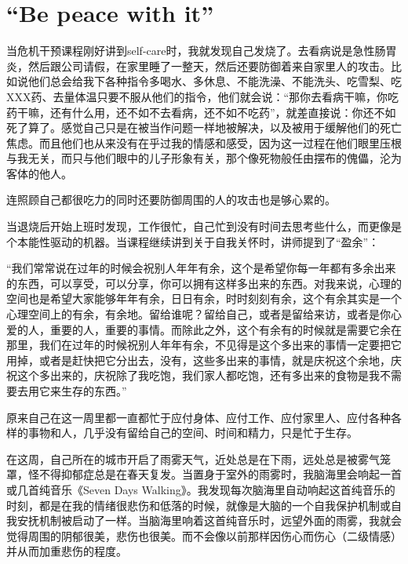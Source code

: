 \chapter{“Be peace with it”}



当危机干预课程刚好讲到self-care时，我就发现自己发烧了。去看病说是急性肠胃炎，然后跟公司请假，在家里睡了一整天，然后还要防御着来自家里人的攻击。比如说他们总会给我下各种指令\pozhehao{}多喝水、多休息、不能洗澡、不能洗头、吃雪梨、吃XXX药、去量体温\pozhehao{}只要不服从他们的指令，他们就会说：“那你去看病干嘛，你吃药干嘛，还有什么用，还不如不去看病，还不如不吃药”，就差直接说：你还不如死了算了。感觉自己只是在被当作问题一样地被解决，以及被用于缓解他们的死亡焦虑。而且他们也从来没有在乎过我的情感和感受，因为这一过程在他们眼里压根与我无关，而只与他们眼中的儿子形象有关，那个像死物般任由摆布的傀儡，沦为客体的他人。

连照顾自己都很吃力的同时还要防御周围的人的攻击也是够心累的。

当退烧后开始上班时发现，工作很忙，自己忙到没有时间去思考些什么，而更像是个本能性驱动的机器。当课程继续讲到关于自我关怀时，讲师提到了“盈余”：

“我们常常说在过年的时候会祝别人年年有余，这个是希望你每一年都有多余出来的东西，可以享受，可以分享，你可以拥有这样多出来的东西。对我来说，心理的空间也是希望大家能够年年有余，日日有余，时时刻刻有余，这个有余其实是一个心理空间上的有余，有余地。留给谁呢？留给自己，或者是留给来访，或者是你心爱的人，重要的人，重要的事情。而除此之外，这个有余有的时候就是需要它余在那里，我们在过年的时候祝别人年年有余，不见得是这个多出来的事情一定要把它用掉，或者是赶快把它分出去，没有，这些多出来的事情，就是庆祝这个余地，庆祝这个多出来的，庆祝除了我吃饱，我们家人都吃饱，还有多出来的食物是我不需要去用它来生存的东西。”

原来自己在这一周里都一直都忙于应付身体、应付工作、应付家里人、应付各种各样的事物和人，几乎没有留给自己的空间、时间和精力，只是忙于生存。



在这周，自己所在的城市开启了雨雾天气，近处总是在下雨，远处总是被雾气笼罩，怪不得抑郁症总是在春天复发。当置身于室外的雨雾时，我脑海里会响起一首或几首纯音乐\pozhehao{}《Seven Days Walking》。我发现每次脑海里自动响起这首纯音乐的时刻，都是在我的情绪很悲伤和低落的时候，就像是大脑的一个自我保护机制或自我安抚机制被启动了一样。当脑海里响着这首纯音乐时，远望外面的雨雾，我就会觉得周围的阴郁很美，悲伤也很美。而不会像以前那样因伤心而伤心（二级情感）并从而加重悲伤的程度。

